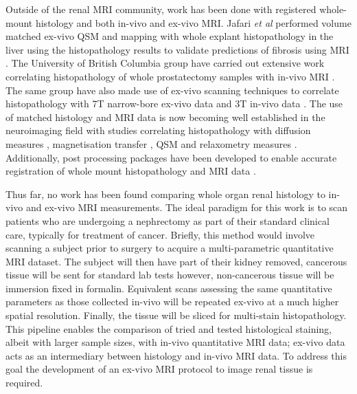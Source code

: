 Outside of the renal \ac{MRI} community, work has been done with registered whole-mount histology and both in-vivo and ex-vivo \ac{MRI}. Jafari \textit{et al} performed volume matched ex-vivo \ac{QSM} and \ttwostar mapping with whole explant histopathology in the liver using the histopathology results to validate predictions of fibrosis using \ac{MRI} \cite{jafari_integrated_2021}. The University of British Columbia group have carried out extensive work correlating histopathology of whole prostatectomy samples with in-vivo \ac{MRI} \cite{sabouri_mr_2017, dhatt_mri_2020}. The same group have also made use of ex-vivo scanning techniques to correlate histopathology with 7T narrow-bore ex-vivo data and 3T in-vivo data \cite{uribe_vivo_2015}. The use of matched histology and \ac{MRI} data is now becoming well established in the neuroimaging field \cite{lazari_can_2021} with studies correlating histopathology with diffusion measures \cite{peters_white_2019, moll_multiple_2011, howard_joint_2019, mollink_white_2019}, magnetisation transfer \cite{mottershead_high_2003, seewann_diffusely_2009}, \ac{QSM} \cite{hametner_influence_2018, stuber_myelin_2014} and relaxometry measures \cite{bagnato_untangling_2018, reeves_combined_2016}. Additionally, post processing packages have been developed to enable accurate registration of whole mount histopathology and \ac{MRI} data \cite{huszar_tensor_2019, huszar_automated_2019}.

Thus far, no work has been found comparing whole organ renal histology to in-vivo and ex-vivo \ac{MRI} measurements. The ideal paradigm for this work is to scan patients who are undergoing a nephrectomy as part of their standard clinical care, typically for treatment of cancer. Briefly, this method would involve scanning a subject prior to surgery to acquire a multi-parametric quantitative \ac{MRI} dataset. The subject will then have part of their kidney removed, cancerous tissue will be sent for standard lab tests however, non-cancerous tissue will be immersion fixed in formalin. Equivalent scans assessing the same quantitative parameters as those collected in-vivo will be repeated ex-vivo at a much higher spatial resolution. Finally, the tissue will be sliced for multi-stain histopathology. This pipeline enables the comparison of tried and tested histological staining, albeit with larger sample sizes, with in-vivo quantitative \ac{MRI} data; ex-vivo data acts as an intermediary between histology and in-vivo \ac{MRI} data. To address this goal the development of an ex-vivo \ac{MRI} protocol to image renal tissue is required.

